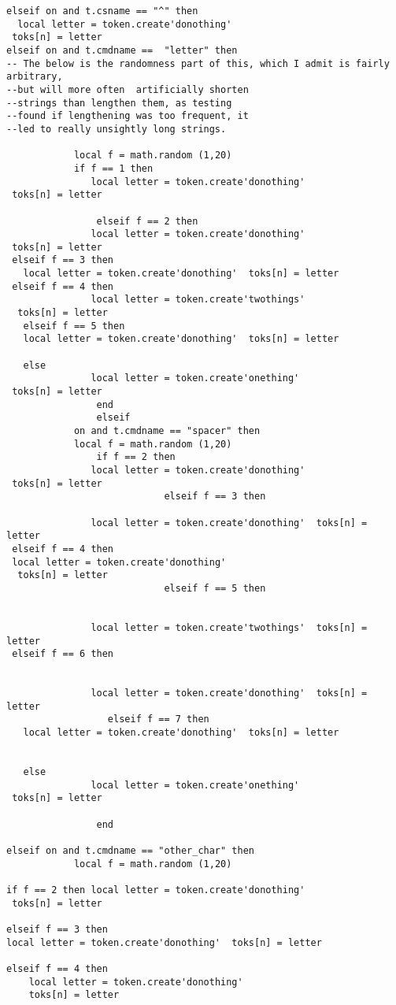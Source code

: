 \documentclass{article}
\begin{document}
\begin{verbatim}
elseif on and t.csname == "^" then
  local letter = token.create'donothing'
 toks[n] = letter
elseif on and t.cmdname ==  "letter" then
-- The below is the randomness part of this, which I admit is fairly arbitrary, 
--but will more often  artificially shorten
--strings than lengthen them, as testing 
--found if lengthening was too frequent, it 
--led to really unsightly long strings. 

            local f = math.random (1,20)
            if f == 1 then
               local letter = token.create'donothing'
 toks[n] = letter

            	elseif f == 2 then
               local letter = token.create'donothing'
 toks[n] = letter
 elseif f == 3 then
   local letter = token.create'donothing'  toks[n] = letter
 elseif f == 4 then
               local letter = token.create'twothings'
  toks[n] = letter
   elseif f == 5 then
   local letter = token.create'donothing'  toks[n] = letter

   else 
               local letter = token.create'onething'
 toks[n] = letter
            	end
            	elseif
            on and t.cmdname == "spacer" then
            local f = math.random (1,20)
            	if f == 2 then
               local letter = token.create'donothing'
 toks[n] = letter
         		            elseif f == 3 then
                    
               local letter = token.create'donothing'  toks[n] = letter
 elseif f == 4 then
 local letter = token.create'donothing'
  toks[n] = letter
           		            elseif f == 5 then
                    

               local letter = token.create'twothings'  toks[n] = letter
 elseif f == 6 then
                    

               local letter = token.create'donothing'  toks[n] = letter
                  elseif f == 7 then
   local letter = token.create'donothing'  toks[n] = letter


   else 
               local letter = token.create'onething'
 toks[n] = letter
 
            	end

elseif on and t.cmdname == "other_char" then
            local f = math.random (1,20)

if f == 2 then local letter = token.create'donothing'
 toks[n] = letter

elseif f == 3 then
local letter = token.create'donothing'  toks[n] = letter
               
elseif f == 4 then
	local letter = token.create'donothing'
  	toks[n] = letter


\end{verbatim}
\end{document}
